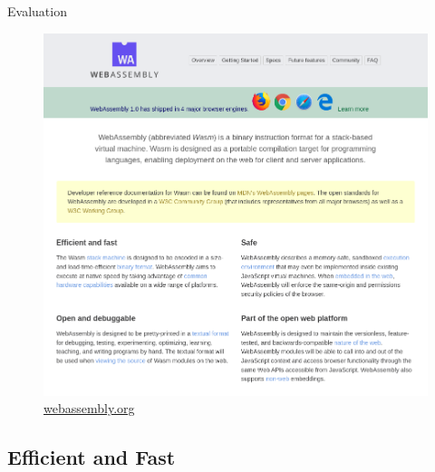 \documentclass{beamer}
\begin{document}
\begin{frame}{Evaluation}
    \begin{figure}
        \includegraphics[scale=0.2]{./images/webassembly_org.png}
        \caption{\href{https://webassembly.org/}{webassembly.org}}
    \end{figure}
\end{frame}

\subsection{Efficient and Fast}
\end{document}
